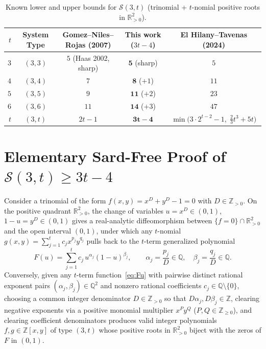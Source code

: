 \documentclass[11pt,a4paper]{amsart}
\theoremstyle{remark}
\newcommand{\R}{\mathbb{R}}
\newcommand{\Q}{\mathbb{Q}}
\newcommand{\Z}{\mathbb{Z}}
\newcommand{\Sfn}{\mathcal{S}}
\begin{document}
\begin{table}[h]
\centering
\caption{Known lower and upper bounds for $\Sfn(3, t)$ (trinomial + $t$-nomial positive roots in $\R_{>0}^2$).}
\label{tab:comparison}
\begin{tabular}{@{}rcccc@{}}
\toprule
$t$ & System Type & Gomez--Niles--Rojas (2007) & \textbf{This work ($3t - 4$)} & El Hilany--Tavenas (2024) \\
\midrule
$3$ & $(3, 3)$ & $5$ (Haas 2002, sharp) & $\mathbf{5}$ (sharp) & $5$ \\
$4$ & $(3, 4)$ & $7$ & $\mathbf{8}$ ($+1$) & $11$ \\
$5$ & $(3, 5)$ & $9$ & $\mathbf{11}$ ($+2$) & $23$ \\
$6$ & $(3, 6)$ & $11$ & $\mathbf{14}$ ($+3$) & $47$ \\
$t$ & $(3, t)$ & $2t - 1$ & $\mathbf{3t - 4}$ & $\min\!\big(3\cdot 2^{t-2}-1,\; \tfrac{2}{3}t^3 + 5t\big)$ \\
\bottomrule
\end{tabular}
\end{table}

\section{Elementary Sard-Free Proof of $\Sfn(3, t) \ge 3t - 4$}

Consider a trinomial of the form $f(x, y) = x^D + y^D - 1 = 0$ with $D \in \Z_{>0}$. On the positive quadrant $\R_{>0}^2$, the change of variables $u = x^D \in (0, 1)$, $1 - u = y^D \in (0, 1)$ gives a real-analytic diffeomorphism between $\{f = 0\} \cap \R_{>0}^2$ and the open interval $(0, 1)$, under which any $t$-nomial $g(x, y) = \sum_{j=1}^t c_j x^{p_j} y^{q_j}$ pulls back to the $t$-term generalized polynomial
\begin{equation}\label{eq:Fu}
  F(u) = \sum_{j=1}^t c_j \, u^{\alpha_j} (1 - u)^{\beta_j}, \qquad \alpha_j = \frac{p_j}{D} \in \Q,\quad \beta_j = \frac{q_j}{D} \in \Q.
\end{equation}
Conversely, given any $t$-term function~\eqref{eq:Fu} with pairwise distinct rational exponent pairs $(\alpha_j, \beta_j) \in \Q^2$ and nonzero rational coefficients $c_j \in \Q \setminus \{0\}$, choosing a common integer denominator $D \in \Z_{>0}$ so that $D\alpha_j, D\beta_j \in \Z$, clearing negative exponents via a positive monomial multiplier $x^P y^Q$ ($P, Q \in \Z_{\ge 0}$), and clearing coefficient denominators produces valid integer polynomials $f, g \in \Z[x, y]$ of type $(3, t)$ whose positive roots in $\R_{>0}^2$ biject with the zeros of $F$ in $(0, 1)$.
\end{document}
